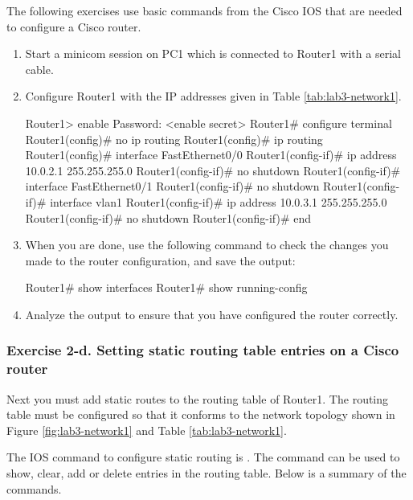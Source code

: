 The following exercises use basic commands from the Cisco IOS that are needed to configure a Cisco router.
\begin{enumerate}
	\item Start a minicom session on PC1 which is connected to Router1 with a serial cable.
	\item Configure Router1 with the IP addresses given in Table \ref{tab:lab3-network1}.
		\begin{cmdblock}
	Router1> enable
	Password: <enable secret>
	Router1# configure terminal
	Router1(config)# no ip routing
	Router1(config)# ip routing
	Router1(config)# interface FastEthernet0/0 
	Router1(config-if)# ip address 10.0.2.1 255.255.255.0 
	Router1(config-if)# no shutdown
	Router1(config-if)# interface FastEthernet0/1
	Router1(config-if)# no shutdown
	Router1(config-if)# interface vlan1
	Router1(config-if)# ip address 10.0.3.1 255.255.255.0 
	Router1(config-if)# no shutdown
	Router1(config-if)# end
		\end{cmdblock}
	\item When you are done, use the following command to check the changes you made to the router configuration, and save the output:
		\begin{cmdblock}
	Router1# show interfaces 
	Router1# show running-config
		\end{cmdblock}
	\item Analyze the output to ensure that you have configured the router correctly.
\end{enumerate}

\begin{questions}
\end{questions}
	
	
\subsubsection{Exercise 2-d. Setting static routing table entries on a Cisco router}

Next you must add static routes to the routing table of Router1. The routing table must be configured so that it conforms to the network topology shown in Figure \ref{fig:lab3-network1} and Table \ref{tab:lab3-network1}.

The IOS command to configure static routing is . The command can be used to show, clear, add or delete entries in the routing table. Below is a summary of the commands.


